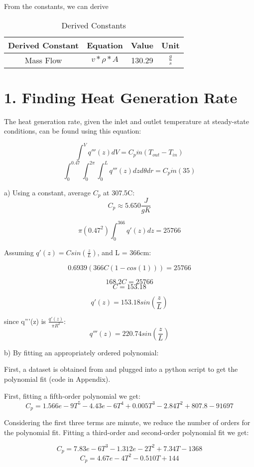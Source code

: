 \documentclass[12pt,letterpaper]{article}
\begin{document}
From the constants, we can derive
\begin{table}[h]
     \centering
    \begin{tabular}{cccc}
    \hline
       Derived Constant & Equation & Value & Unit \\
    \hline
       Mass Flow & $ v * \rho * A $ & 130.29 & $\frac{g}{s}$ \\
    \hline
    \end{tabular}
    \caption {Derived Constants}
    \label{tab:der_constants}
\end{table}



\section* {1. Finding Heat Generation Rate}

The heat generation rate, given the inlet and outlet temperature
at steady-state conditions, can be found using this equation:

\[\int^{V} q'''(z) dV = C_p \dot{m} (T_{out} - T_{in})\]
\[\int^{0.47}_{0} \int^{2\pi}_{0} \int^{L}_{0} q'''(z) dz d\theta dr= C_p \dot{m} (35)\]

a) Using a constant, average $C_p$ at 307.5C:
\[C_p \approx 5.650 \frac{J}{g K}\]

\[ \pi (0.47^2)  \int^{366}_{0} q'(z) dz = 25766\]

Assuming $q'(z) = C sin(\frac{z}{L})$,
and L = 366cm:

\[ 0.6939 (366C(1-cos(1))) = 25766\]

\[168.2C = 25766\]
\[C = 153.18 \]

\[q'(z) = 153.18 sin(\frac{z}{L})\]

since q'''(z) is $\frac{q'(z)}{\pi R^2}$:
\[q'''(z) = 220.74 sin(\frac{z}{L})\]

b) By fitting an appropriately ordered polynomial:

First, a dataset is obtained from \cite{moran_fundamentals_2010}
and plugged into a python script to get the polynomial fit
(code in Appendix).

First, fitting a fifth-order polynomial we get:
\[C_p = 1.566e-9 T^5 -4.43e-6 T^4 +0.005 T^3 -2.84 T^2 + 807.8 -91697\]

Considering the first three terms are minute, we reduce the 
number of orders for the polynomial fit. Fitting a third-order and 
second-order polynomial fit we get:

\[C_p = 7.83e-6 T^3 - 1.312e-2 T^2 + 7.34 T - 1368 \]
\[C_p = 4.67e-4 T^2 - 0.510 T + 144 \]
\end{document}
